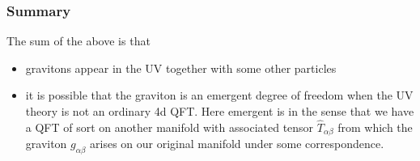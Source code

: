 \documentclass{article}
\begin{document}
\subsubsection{Summary}
The sum of the above is that 
\begin{itemize}
	\item gravitons appear in the UV together with some other particles
	\item it is possible that the graviton is an emergent degree of freedom when the UV theory is not an ordinary 4d QFT. Here emergent is in the sense that we have a QFT of sort on another manifold with associated tensor $\hat{T}_{\alpha \beta}$ from which the graviton $g_{\alpha \beta}$ arises on our original manifold under some correspondence. 
\end{itemize}

\end{document}
